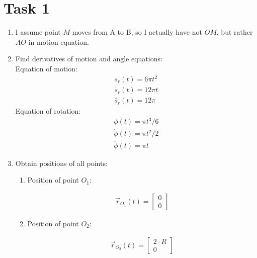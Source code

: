 \section{Task 1}

\begin{enumerate}
    \item I assume point $M$ moves from A to B,
          so I actually have not $OM$, but rather $AO$ in motion equation.
    \item Find derivatives of motion and angle equations: \\
          Equation of motion:
          \begin{align}
              s_r(t) = 6 \pi t^2      \\
              \dot{s_r}(t) = 12 \pi t \\
              \ddot{s_r}(t) = 12 \pi
          \end{align}
          Equation of rotation:
          \begin{align}
              \phi(t) = \pi t^3/6       \\
              \dot{\phi}(t) = \pi t^2/2 \\
              \ddot{\phi}(t) = \pi t
          \end{align}
    \item Obtain positions of all points:
          \begin{enumerate}
              \item Position of point $O_1$:
                    \begin{answer}
                        \begin{align}
                            \vec{r}_{O_1}(t) = \begin{bmatrix}
                                0 \\
                                0
                            \end{bmatrix}
                        \end{align}
                    \end{answer}
              \item Position of point $O_2$:
                    \begin{answer}
                        \begin{align}
                            \vec{r}_{O_2}(t) = \begin{bmatrix}
                                2 \cdot R \\
                                0
                            \end{bmatrix}

\end{align}
\end{answer}
\end{enumerate}
\end{enumerate}
